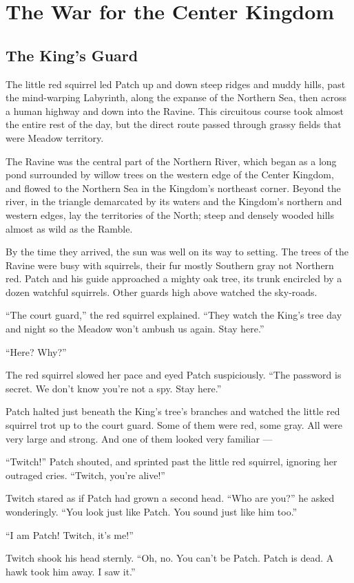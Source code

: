 \documentclass[ebook,oneside,openany,17pt]{memoir}
\renewcommand{\thechapter}{\Roman{chapter}}
\newcounter{sections}
\newcommand{\sections}[1]{%
  \section*{#1}
  \addtocounter{sections}{1}%
  \pdfbookmark[1]{#1}{section.\thechapter.\thesections}}
\begin{document}

\chapter{The War for the Center Kingdom}

\sections{The King’s Guard}

The little red squirrel led Patch up and down steep ridges and muddy
hills, past the mind-warping Labyrinth, along the expanse of the
Northern Sea, then across a human highway and down into the
Ravine. This circuitous course took almost the entire rest of the day,
but the direct route passed through grassy fields that were Meadow
territory.

The Ravine was the central part of the Northern River, which began as
a long pond surrounded by willow trees on the western edge of the
Center Kingdom, and flowed to the Northern Sea in the Kingdom’s
northeast corner. Beyond the river, in the triangle demarcated by its
waters and the Kingdom’s northern and western edges, lay the
territories of the North; steep and densely wooded hills almost as
wild as the Ramble.

By the time they arrived, the sun was well on its way to setting. The
trees of the Ravine were busy with squirrels, their fur mostly
Southern gray not Northern red. Patch and his guide approached a
mighty oak tree, its trunk encircled by a dozen watchful
squirrels. Other guards high above watched the sky-roads.

“The court guard,” the red squirrel explained. “They watch the King’s
tree day and night so the Meadow won’t ambush us again. Stay here.”

“Here? Why?”

The red squirrel slowed her pace and eyed Patch suspiciously. “The
password is secret. We don’t know you’re not a spy. Stay here.”

Patch halted just beneath the King’s tree’s branches and watched the
little red squirrel trot up to the court guard. Some of them were red,
some gray. All were very large and strong. And one of them looked very
familiar —

“Twitch!” Patch shouted, and sprinted past the little red squirrel,
ignoring her outraged cries. “Twitch, you’re alive!”

Twitch stared as if Patch had grown a second head. “Who are you?” he
asked wonderingly. “You look just like Patch. You sound just like him
too.”

“I am Patch! Twitch, it’s me!”

Twitch shook his head sternly. “Oh, no. You can’t be Patch. Patch is
dead. A hawk took him away. I saw it.”
\end{document}
